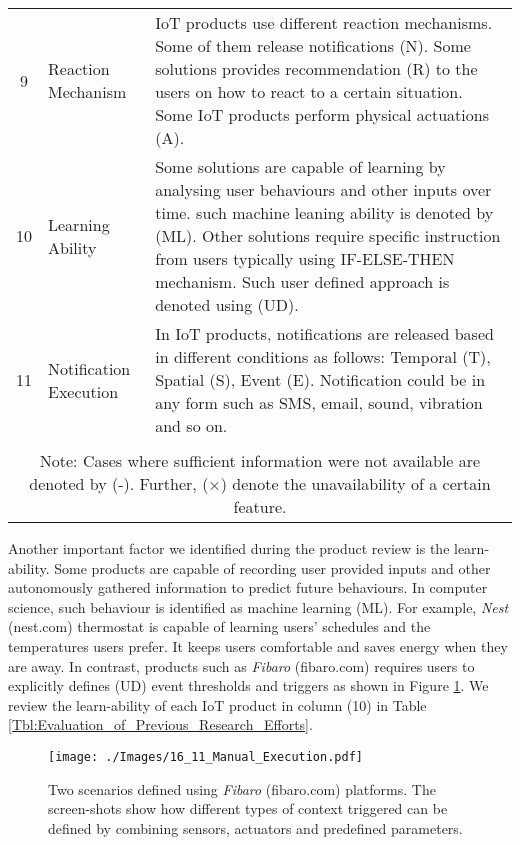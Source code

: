 \documentclass[journal]{IEEEtran}
\begin{document}
\begin{table*}[t]
\begin{tabular}{ c l m{13cm} }
9 & Reaction  Mechanism &  IoT products use different reaction mechanisms. Some of them release notifications (N). Some solutions provides recommendation (R) to the users on how to react to a certain situation. Some IoT products perform physical actuations (A).\\
10 & Learning Ability & Some solutions are capable of learning  by analysing user behaviours and other inputs over time. such machine leaning ability is denoted by (ML). Other solutions require specific instruction from users typically using IF-ELSE-THEN mechanism. Such user defined approach is denoted using (UD). \\
11 & Notification Execution &   In IoT products, notifications are released based in different conditions as follows: Temporal (T), Spatial (S), Event (E). Notification could be in any form such as SMS, email, sound, vibration and so on.\\



  \\ \hline
\multicolumn{3}{c}{Note: Cases where sufficient information were not available are denoted by (-). Further, ($\times$) denote the unavailability of a certain feature.}
\end{tabular}
\label{Tbl:Summarized_taxonmy}
\end{table*}




Another important factor we identified during the product review is the learn-ability. Some products are capable of recording user provided inputs and other autonomously gathered information to predict future behaviours. In computer science, such behaviour is identified as machine learning (ML). For example, \textit{Nest} (nest.com) thermostat is capable of learning users' schedules and the temperatures users prefer. It keeps users comfortable and saves energy when they are away. In contrast, products such as \textit{Fibaro} (fibaro.com) requires users to explicitly  defines (UD) event thresholds and triggers as shown in Figure \ref{Figure:Manual_Execution}. We review the learn-ability of each  IoT product  in column (10) in Table \ref{Tbl:Evaluation_of_Previous_Research_Efforts}.

 
      \begin{figure}[!h]
       \centering
\texttt{[image: ./Images/16\_11\_Manual\_Execution.pdf]}
\caption{Two scenarios defined using \textit{Fibaro} (fibaro.com) platforms. The screen-shots  show how different types of context triggered can be defined by combining sensors, actuators and predefined parameters.}
       \label{Figure:Manual_Execution}	
\end{figure}
   
\end{document}
